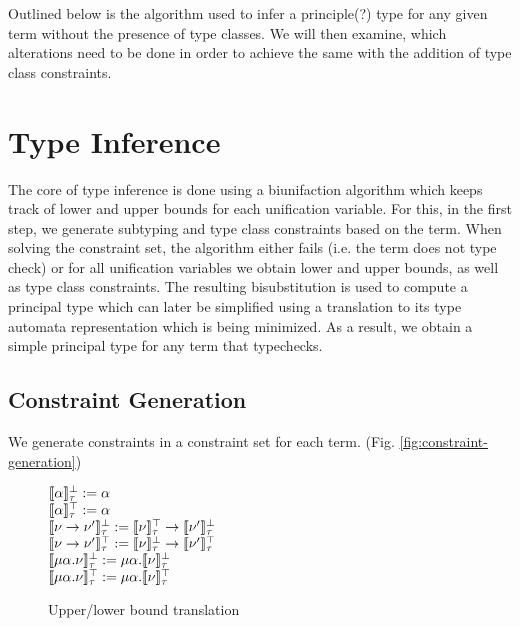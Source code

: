 Outlined below is the algorithm used to infer a principle(?) type for any given term without the presence of type classes.
We will then examine, which alterations need to be done in order to achieve the same with the addition of type class constraints.

\section{Type Inference}
\label{sec:type-inference}

The core of type inference is done using a biunifaction algorithm which keeps track of lower and upper bounds for each unification variable.
For this, in the first step, we generate subtyping and type class constraints based on the term.
When solving the constraint set, the algorithm either fails (i.e. the term does not type check) or for all unification variables we obtain lower and upper bounds, as well as type class constraints.
The resulting bisubstitution is used to compute a principal type which can later be simplified using a translation to its type automata representation which is being minimized.
As a result, we obtain a simple principal type for any term that typechecks.

\subsection{Constraint Generation}

We generate constraints in a constraint set for each term. (Fig. \ref{fig:constraint-generation})


\begin{figure}[h]
    \begin{center}
        $\llbracket \alpha \rrbracket_\tau^\bot := \alpha$ \\
        $\llbracket \alpha \rrbracket_\tau^\top := \alpha$ \\
        $\llbracket \nu \to \nu' \rrbracket_\tau^\bot := \llbracket \nu \rrbracket_\tau^\top \to \llbracket \nu' \rrbracket_\tau^\bot$ \\
        $\llbracket \nu \to \nu' \rrbracket_\tau^\top := \llbracket \nu \rrbracket_\tau^\bot \to \llbracket \nu' \rrbracket_\tau^\top$ \\
        $\llbracket \mu\alpha.\nu \rrbracket_\tau^\bot := \mu\alpha.\llbracket \nu \rrbracket_\tau^\bot$ \\
        $\llbracket \mu\alpha.\nu \rrbracket_\tau^\top := \mu\alpha.\llbracket \nu \rrbracket_\tau^\top$ \\
    \end{center}
    \caption{Upper/lower bound translation}
    \label{fig:bound-translation}
\end{figure}


